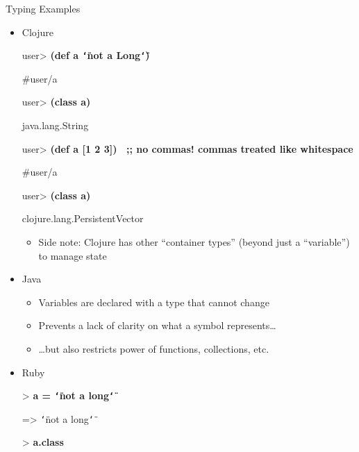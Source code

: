 \documentclass{beamer}
\renewcommand{\textquotedbl}{\texttt{\char`\"}}
\begin{document}
\begin{frame}[allowframebreaks]{Typing Examples}
  \begin{itemize}
  \item Clojure\\
\begin{small}
{\ttfamily\color{black}
%
\textcolor[rgb]{0.49803922,0.0,0.49803922}{user{\textgreater}
}\textbf{(def a {\textquotedbl}not a Long{\textquotedbl})}}

{\ttfamily\color{black}
\#{\textquotesingle}user/a}

{\ttfamily\color{black}
\textcolor[rgb]{0.49803922,0.0,0.49803922}{user{\textgreater}
}\textbf{(class a)}}

{\ttfamily\color{black}
java.lang.String}

{\ttfamily\color{black}
\textcolor[rgb]{0.49803922,0.0,0.49803922}{user{\textgreater}
}\textbf{(def a [1 2 3]) \ ;; no commas! commas treated like
whitespace}}

{\ttfamily\color{black}
\#{\textquotesingle}user/a}

{\ttfamily\color{black}
\textcolor[rgb]{0.49803922,0.0,0.49803922}{user{\textgreater}
}\textbf{(class a)}}

{\ttfamily\color{black}
clojure.lang.PersistentVector}
  \begin{itemize}
  \item Side note: Clojure has other ``container types'' (beyond
    just a ``variable'') to manage state
  \end{itemize}
\end{small}
  \item Java
    \begin{itemize}
    \item Variables are declared with a type that cannot change
    \item Prevents a lack of clarity on what a symbol represents\ldots
    \item \ldots but also restricts power of functions, collections, etc.
    \end{itemize}
  \item Ruby\\
\begin{small}
{\ttfamily\color{black}
%
\textcolor[rgb]{0.0,0.0,0.8039216}{{\textgreater} }\textbf{a =
{\textquotedbl}not a long{\textquotedbl}}}

{\ttfamily\color{black}
={\textgreater} {\textquotedbl}not a long{\textquotedbl}}

{\ttfamily\color{black}
\textcolor[rgb]{0.0,0.0,0.8039216}{{\textgreater} }\textbf{a.class}}


\end{small}
\end{itemize}
\end{frame}
\end{document}
